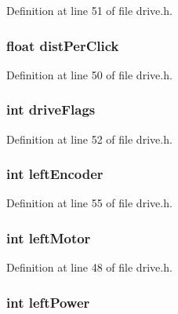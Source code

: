 Definition at line 51 of file drive.h.

\hypertarget{struct_d_r_i_v_e_ae00ce968ccc79179365d3e1391cd1e74}{
\subsubsection[{distPerClick}]{\setlength{\rightskip}{0pt plus 5cm}float {\bf distPerClick}}}
\label{struct_d_r_i_v_e_ae00ce968ccc79179365d3e1391cd1e74}


Definition at line 50 of file drive.h.

\hypertarget{struct_d_r_i_v_e_adda084ef25108fe61f2fe58d0ebd809e}{
\subsubsection[{driveFlags}]{\setlength{\rightskip}{0pt plus 5cm}int {\bf driveFlags}}}
\label{struct_d_r_i_v_e_adda084ef25108fe61f2fe58d0ebd809e}


Definition at line 52 of file drive.h.

\hypertarget{struct_d_r_i_v_e_a85b2a8a5c3d01c5c110092daf8b72db3}{
\subsubsection[{leftEncoder}]{\setlength{\rightskip}{0pt plus 5cm}int {\bf leftEncoder}}}
\label{struct_d_r_i_v_e_a85b2a8a5c3d01c5c110092daf8b72db3}


Definition at line 55 of file drive.h.

\hypertarget{struct_d_r_i_v_e_aaf76718632f46504ae116a755a231698}{
\subsubsection[{leftMotor}]{\setlength{\rightskip}{0pt plus 5cm}int {\bf leftMotor}}}
\label{struct_d_r_i_v_e_aaf76718632f46504ae116a755a231698}


Definition at line 48 of file drive.h.

\hypertarget{struct_d_r_i_v_e_a858af4a4b363a1ba3d939ea4207ff2f0}{
\subsubsection[{leftPower}]{\setlength{\rightskip}{0pt plus 5cm}int {\bf leftPower}}}
\label{struct_d_r_i_v_e_a858af4a4b363a1ba3d939ea4207ff2f0}


